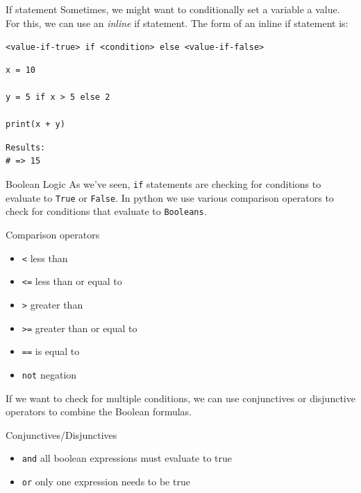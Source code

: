 \documentclass[10pt]{beamer}
\begin{document}
\begin{frame}[label={sec:orgd614a96},fragile]{If statement}
 Sometimes, we might want to conditionally set a variable a value. For this, we can
use an \emph{inline} if statement. The form of an inline if statement is:

\texttt{<value-if-true> if <condition> else <value-if-false>}

\begin{verbatim}
x = 10

y = 5 if x > 5 else 2

print(x + y)
\end{verbatim}

\begin{verbatim}
Results: 
# => 15
\end{verbatim}
\end{frame}

\begin{frame}[label={sec:org4139443},fragile]{Boolean Logic}
 As we've seen, \texttt{if} statements are checking for conditions to evaluate to \texttt{True} or
\texttt{False}. In python we use various comparison operators to check for conditions that
evaluate to \texttt{Booleans}.

Comparison operators

\begin{itemize}
\item \texttt{<} less than
\item \texttt{<=} less than or equal to
\item \texttt{>} greater than
\item \texttt{>=} greater than or equal to
\item \texttt{==} is equal to
\item \texttt{not} negation
\end{itemize}

If we want to check for multiple conditions, we can use conjunctives or disjunctive
operators to combine the Boolean formulas.

Conjunctives/Disjunctives

\begin{itemize}
\item \texttt{and} all boolean expressions must evaluate to true
\item \texttt{or} only one expression needs to be true
\end{itemize}
\end{frame}
\end{document}
